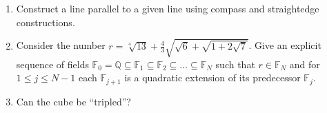 \documentclass[11pt]{article}
\renewcommand\subset\subseteq
\theoremstyle{definition}
\newenvironment{solution}{{\it Solution.} }{\hfill {\color{lightgray}$\blacksquare$}}
\begin{document}
\begin{enumerate}
  \item Construct a line parallel to a given line using compass and straightedge constructions.

  \item Consider the number $r = \sqrt[4]{13}+\frac{4}{3}\sqrt{\sqrt{6}+\sqrt{1+2\sqrt{7}}}$. Give an explicit sequence of fields
  $\mathbb{F}_0 = \mathbb{Q} \subset \mathbb{F}_1 \subset \mathbb{F}_2 \subset \dots \subset \mathbb{F}_N$ such that $r \in \mathbb{F}_N$
  and for $1 \leq j \leq N-1$ each $\mathbb{F}_{j+1}$ is a quadratic extension of its predecessor $\mathbb{F}_j$.

  \item Can the cube be ``tripled''?


\end{enumerate}
\end{document}
